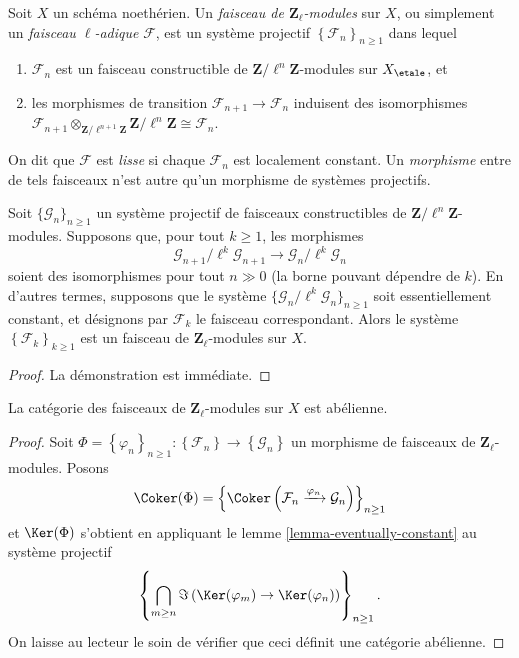 \begin{definition}
\label{definition-l-adic-sheaf}
Soit $X$ un schéma noethérien. Un {\it faisceau de $\mathbf{Z}_\ell$-modules} sur $X$, ou
simplement un {\it faisceau $\ell$-adique} $\mathcal{F}$, est un
système projectif $\left\{\mathcal{F}_n\right\}_{n\geq 1}$ dans lequel
\begin{enumerate}
\item
$\mathcal{F}_n$ est un faisceau constructible de $\mathbf{Z}/\ell^n\mathbf{Z}$-modules sur
$X_\etale$, et
\item
les morphismes de transition $\mathcal{F}_{n+1}\to \mathcal{F}_n$ induisent des isomorphismes
$\mathcal{F}_{n+1} \otimes_{\mathbf{Z}/\ell^{n+1}\mathbf{Z}}
\mathbf{Z}/\ell^n\mathbf{Z} \cong \mathcal{F}_n$.
\end{enumerate}
On dit que $\mathcal{F}$ est {\it lisse} si chaque $\mathcal{F}_n$ est localement
constant. Un {\it morphisme} entre de tels faisceaux n'est autre qu'un morphisme de systèmes projectifs.
\end{definition}

\begin{lemma}
\label{lemma-eventually-constant}
Soit $\{\mathcal{G}_n\}_{n\geq 1}$ un système projectif de faisceaux constructibles de
$\mathbf{Z}/\ell^n\mathbf{Z}$-modules.
Supposons que, pour tout $k\geq 1$, les morphismes
$$
\mathcal{G}_{n+1}/\ell^k \mathcal{G}_{n+1}\to \mathcal{G}_n /\ell^k
\mathcal{G}_n
$$
soient des isomorphismes pour tout $n\gg 0$ (la borne pouvant dépendre de $k$).
En d'autres termes, supposons que le système
$\{\mathcal{G}_n/\ell^k\mathcal{G}_n\}_{n\geq 1}$
soit essentiellement constant, et désignons par $\mathcal{F}_k$ le faisceau correspondant.
Alors le système $\left\{\mathcal{F}_k\right\}_{k\geq 1}$ est un
faisceau de $\mathbf{Z}_\ell$-modules sur $X$.
\end{lemma}

\begin{proof}
La démonstration est immédiate.
\end{proof}

\begin{lemma}
\label{lemma-l-adic-abelian}
La catégorie des faisceaux de $\mathbf{Z}_\ell$-modules sur $X$ est abélienne.
\end{lemma}

\begin{proof}
Soit
$\Phi = \left\{\varphi_n\right\}_{n\geq 1} :
\left\{\mathcal{F}_n\right\}
\to
\left\{\mathcal{G}_n\right\}$
un morphisme de faisceaux de $\mathbf{Z}_\ell$-modules. Posons
$$
\Coker(\Phi) =
\left\{
\Coker\left(\mathcal{F}_n \xrightarrow{\varphi_n} \mathcal{G}_n\right)
\right\}_{n\geq 1}
$$
et $\Ker(\Phi)$ s'obtient en appliquant le
lemme \ref{lemma-eventually-constant}
au système projectif
$$
\left\{
\bigcap_{m\geq n}
\Im\left(\Ker(\varphi_m) \to \Ker(\varphi_n)\right)
\right\}_{n \geq 1}.
$$
On laisse au lecteur le soin de vérifier que ceci définit une catégorie abélienne.
\end{proof}


